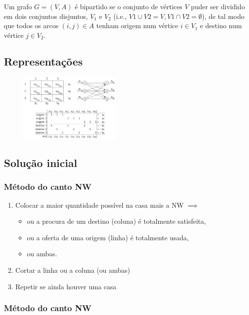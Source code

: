 \documentclass[10pt, a4paper]{article}
\begin{document}
\begin{multicols}{2}
Um grafo \(G = (V, A)\) é bipartido se o conjunto de vértices \(V\) puder ser dividido em dois conjuntos disjuntos, \(V_1\) e \(V_2\) (i.e., \(V1 \cup V2 = V,V1 \cap V2 = \emptyset\)), de tal modo que todos os arcos \((i,j) \in A\) tenham origem num vértice \(i \in V_1\) e destino num vértice \(j \in V_2\).

\subsection{Representações}

\begin{figure}[H]
    \centering
    \includegraphics[width=0.45\textwidth]{bipartidos_repr.png}
\end{figure}

\subsection{Solução inicial}

\subsubsection{Método do canto NW}

\begin{enumerate}
    \item Colocar a maior quantidade possível na casa mais a NW \(\implies\)
    \begin{itemize}
        \item ou a procura de um destino (coluna) é totalmente satisfeita,
        \item ou a oferta de uma origem (linha) é totalmente usada,
        \item ou ambas.
    \end{itemize}
    \item Cortar a linha ou a coluna (ou ambas)
    \item Repetir se ainda houver uma casa
\end{enumerate}

\subsubsection{Método do canto NW}


\end{multicols}
\end{document}
